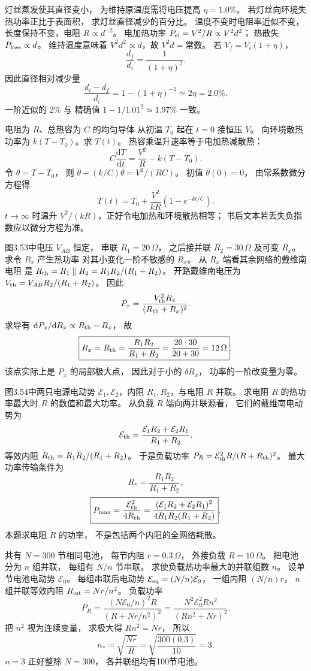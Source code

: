 灯丝蒸发使其直径变小，
为维持原温度需将电压提高
$\eta=1.0\%$。
若灯丝向环境失热功率正比于表面积，
求灯丝直径减少的百分比。
\exsolution
温度不变时电阻率近似不变，
长度保持不变，电阻 $R\propto d^{-2}$。
电加热功率
$P_{\rm el}=V^2/R\propto V^2d^2$；
热散失 $P_{\rm loss}\propto d$。
维持温度意味着
$V^2d^2\propto d$，故 $V^2d=\text{常数}$。
若 $V_f=V_i(1+\eta)$，
\[
\frac{d_f}{d_i}=\frac1{(1+\eta)^2}.
\]
因此直径相对减少量
\[
\boxed{\frac{d_i-d_f}{d_i}
=1-(1+\eta)^{-2}\simeq2\eta=2.0\%}.
\]
\excheck 一阶近似的 2\% 与
精确值 $1-1/1.01^2\simeq1.97\%$ 一致。

电阻为 $R$、总热容为 $C$ 的均匀导体
从初温 $T_0$ 起在 $t=0$ 接恒压 $V$。
向环境散热功率为
$k(T-T_0)$。求 $T(t)$。
\exsolution
热容乘温升速率等于电加热减散热：
\[
C\frac{\mathrm dT}{\mathrm dt}
=\frac{V^2}R-k(T-T_0).
\]
令 $\theta=T-T_0$，
则
$\dot\theta+(k/C)\theta=V^2/(RC)$。
初值 $\theta(0)=0$，
由常系数微分方程得
\[
\boxed{T(t)=T_0+
\frac{V^2}{kR}\left(1-e^{-kt/C}\right)}.
\]
\excheck $t\to\infty$ 时温升
$V^2/(kR)$，正好令电加热和环境散热相等；
书后文本若丢失负指数应以微分方程为准。

图3.53中电压 $V_{AB}$ 恒定，
串联 $R_1=20\,\Omega$，
之后接并联 $R_2=30\,\Omega$
及可变 $R_x$。求令 $R_x$ 产生热功率
对其小变化一阶不敏感的 $R_x$。
\exsolution
从 $R_x$ 端看其余网络的戴维南电阻
是
$R_{\rm th}=R_1\parallel R_2
=R_1R_2/(R_1+R_2)$。
开路戴维南电压为
$V_{\rm th}=V_{AB}R_2/(R_1+R_2)$。
因此
\[
P_x=\frac{V_{\rm th}^2R_x}
{(R_{\rm th}+R_x)^2}.
\]
求导有
$\mathrm dP_x/\mathrm dR_x\propto
R_{\rm th}-R_x$，
故
\[
\boxed{R_x=R_{\rm th}
=\frac{R_1R_2}{R_1+R_2}
=\frac{20\cdot30}{20+30}=12\,\Omega}.
\]
\excheck 该点实际上是 $P_x$ 的局部极大点，
因此对于小的 $\delta R_x$，
功率的一阶改变量为零。

图3.54中两只电源电动势
$\mathcal E_1,\mathcal E_2$，内阻
$R_1,R_2$，与电阻 $R$ 并联。
求电阻 $R$ 的热功率最大时
$R$ 的数值和最大功率。
\exsolution
从负载 $R$ 端向两并联源看，
它们的戴维南电动势为
\[
\mathcal E_{\rm th}=
\frac{\mathcal E_1R_2+\mathcal E_2R_1}{R_1+R_2},
\]
等效内阻
$R_{\rm th}=R_1R_2/(R_1+R_2)$。
于是负载功率
$P_R=\mathcal E_{\rm th}^2R/(R+R_{\rm th})^2$。
最大功率传输条件为
\[
\boxed{R_*=\frac{R_1R_2}{R_1+R_2}},
\]
\[
\boxed{P_{\max}=
\frac{\mathcal E_{\rm th}^2}{4R_{\rm th}}
=\frac{(\mathcal E_1R_2+\mathcal E_2R_1)^2}
{4R_1R_2(R_1+R_2)}}.
\]
\excheck 本题求电阻 $R$ 的功率，
不是包括两个内阻的全网络耗散。

共有 $N=300$ 节相同电池，
每节内阻 $r=0.3\,\Omega$，
外接负载 $R=10\,\Omega$。
把电池分为 $n$ 组并联，
每组有 $N/n$ 节串联。
求使负载热功率最大的并联组数 $n$。
\exsolution
设单节电池电动势 $\mathcal E_0$。
每组串联后电动势
$\mathcal E_{\rm eq}=(N/n)\mathcal E_0$，
一组内阻 $(N/n)r$，
$n$ 组并联等效内阻
$R_{\rm int}=Nr/n^2$。
负载功率
\[
P_R=\frac{(N\mathcal E_0/n)^2 R}
{(R+Nr/n^2)^2}
=\frac{N^2\mathcal E_0^2Rn^2}
{(Rn^2+Nr)^2}.
\]
把 $n^2$ 视为连续变量，
求极大得 $Rn^2=Nr$，
所以
\[
\boxed{n_*=\sqrt{\frac{Nr}R}
=\sqrt{\frac{300(0.3)}{10}}=3}.
\]
\excheck $n=3$ 正好整除 $N=300$，
各并联组均有100节电池。

